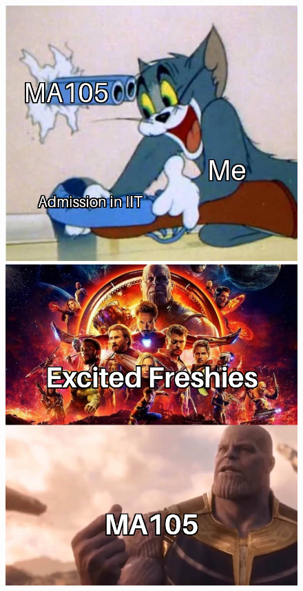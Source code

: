 \documentclass[handout, aspectratio=169]{beamer}
\begin{document}
\begin{frame} 
	\begin{figure}[t]
		\begin{minipage}{0.48\textwidth}
			\centering
			\includegraphics[width=7.5 cm]{27.jpg}
			
		\end{minipage}
		\begin{minipage}{0.48\textwidth}
			\centering
			\includegraphics[width=5 cm]{28.jpg}
			
		\end{minipage}
	\end{figure}
\end{frame}
\end{document}

